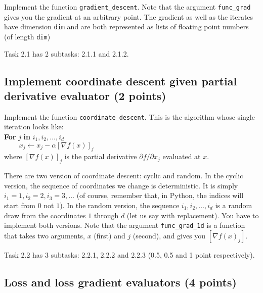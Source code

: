 \documentclass{article}
\begin{document}
Implement the function {\tt gradient\_descent}. Note that the argument {\tt func\_grad} gives you the gradient at an arbitrary point. The gradient 
as well as the iterates have dimension {\tt dim} and are both represented as lists of floating point numbers (of length {\tt dim})

Task 2.1 has 2 subtasks: 2.1.1 and 2.1.2.

\subsection{Implement coordinate descent given partial derivative evaluator (2 points)}

Implement the function {\tt coordinate\_descent}. This is the algorithm whose single iteration looks like:\\

\noindent
{\bf For} $j$ {\bf in} $i_1, i_2, \ldots, i_d$ \\
$\phantom{aaaa} x_j \gets x_j - \alpha [\nabla f(x)]_j$\\

\noindent
where $[\nabla f(x)]_j$ is the partial derivative $\partial f/\partial x_j$ evaluated at $x$.

There are two version of coordinate descent: cyclic and random. In the cyclic version, the sequence of coordinates we change is deterministic. It is simply $i_1=1,
i_2=2, i_3=3, \ldots$ (of course, remember that, in Python, the indices will start from $0$ not $1$).
In the random version, the sequence $i_1, i_2, \ldots, i_d$ is a random draw from the coordinates $1$ through $d$ (let us say with replacement). You have to implement
both versions. Note that the argument {\tt func\_grad\_1d} is a function that takes two arguments, $x$ (first) and $j$ (second), and gives you $[\nabla f(x)_j]$.

Task 2.2 has 3 subtasks: 2.2.1, 2.2.2 and 2.2.3 (0.5, 0.5 and 1 point respectively).

\subsection{Loss and loss gradient evaluators (4 points)}
\end{document}
